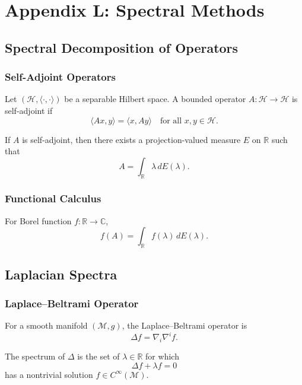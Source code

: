 \chapter*{Appendix L: Spectral Methods}

\section{Spectral Decomposition of Operators}

\subsection{Self-Adjoint Operators}

Let $(\mathcal{H},\langle\cdot,\cdot\rangle)$ be a separable Hilbert space.  
A bounded operator $A:\mathcal{H}\to\mathcal{H}$ is self-adjoint if
\[
\langle Ax,y\rangle = \langle x,Ay\rangle
\quad
\text{for all } x,y\in\mathcal{H}.
\]

\begin{theorem}
If $A$ is self-adjoint, then there exists a projection-valued measure $E$ on $\mathbb{R}$ such that
\[
A = \int_{\mathbb{R}} \lambda \, dE(\lambda).
\]
\end{theorem}

\subsection{Functional Calculus}

For Borel function $f:\mathbb{R}\to\mathbb{C}$,
\[
f(A) = \int_{\mathbb{R}} f(\lambda) \, dE(\lambda).
\]

\section{Laplacian Spectra}

\subsection{Laplace--Beltrami Operator}

For a smooth manifold $(\mathcal{M},g)$, the Laplace--Beltrami operator is
\[
\Delta f = \nabla_i\nabla^i f.
\]

\begin{definition}[Spectrum]
The spectrum of $\Delta$ is the set of $\lambda\in\mathbb{R}$ for which
\[
\Delta f + \lambda f = 0
\]
has a nontrivial solution $f\in C^\infty(\mathcal{M})$.
\end{definition}

